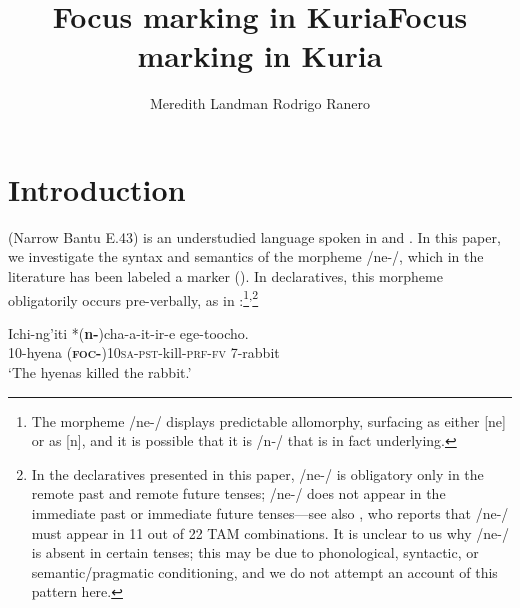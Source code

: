 \documentclass[output=paper,modfonts]{langscibook}
\title{Focus marking in Kuria}
\author{Meredith Landman\affiliation{Pomona College}\lastand
Rodrigo Ranero\affiliation{University of Maryland, College Park}
}
\begin{document}
\maketitle
 
\title{Focus marking in Kuria}
 

 
\section{Introduction} 

 (Narrow Bantu E.43) is an understudied language spoken in  and . In this paper, we investigate the syntax and semantics of the  morpheme /ne-/, which in the literature has been labeled a  marker (\citealt{Cammenga2004,Mwita2008}). In declaratives, this morpheme obligatorily occurs pre-verbally, as in :\footnote{The morpheme /ne-/ displays predictable allomorphy, surfacing as either [ne] or as [n], and it is possible that it is /n-/ that is in fact underlying.}\textsuperscript{,}\footnote{In the declaratives presented in this paper, /ne-/ is obligatory only in the remote past and remote future tenses; /ne-/ does not appear in the immediate past or immediate future tenses—see also \citealt{Mwita2008}, who reports that /ne-/ must appear in 11 out of 22 TAM combinations. It is unclear to us why /ne-/ is absent in certain tenses; this may be due to phonological, syntactic, or semantic/pragmatic conditioning, and we do not attempt an account of this pattern here.}


\ea\label{ex:landmann:1}
  \gll Ichi-ng’iti *(\textbf{n-})cha-a-it-ir-e ege-toocho.\\
     10-hyena (\textsc{\textbf{foc}}\textbf{-})\textsc{10sa}-\textsc{pst}-kill-\textsc{prf}-\textsc{fv} 7-rabbit\\
\glt ‘The hyenas killed the rabbit.’
\z
\end{document}
